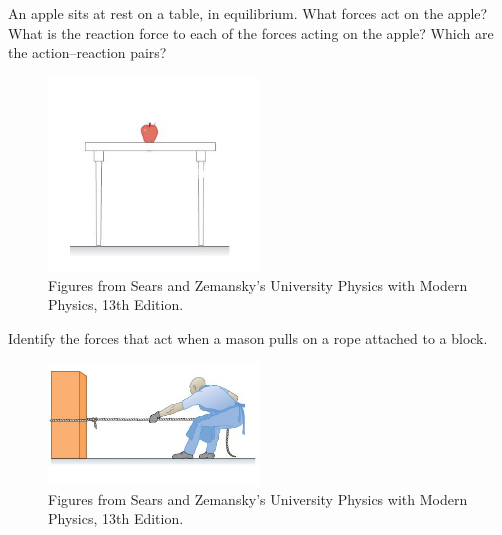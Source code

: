 \documentclass[]{beamer}
\begin{document}
    \begin{frame}
      An apple sits at rest on a table, in equilibrium. What forces act on
      the apple? What is the reaction force to each of the forces acting on
      the apple? Which are the action–reaction pairs?
      \vspace{5mm}
    

      \begin{figure}[h!]  
        \includegraphics[width=0.5\textwidth]{images/f12.jpg}
        \caption{ {\tiny Figures from Sears and Zemansky's University Physics 
        with Modern Physics, 13th Edition.} }
      \end{figure}

      \end{frame}











    

    \begin{frame}
      Identify the forces that act when a mason pulls on a rope attached to a block.
      \vspace{5mm}
    

      \begin{figure}[h!]  
        \includegraphics[width=0.5\textwidth]{images/f13.jpg}
        \caption{ {\tiny Figures from Sears and Zemansky's University Physics 
        with Modern Physics, 13th Edition.} }
      \end{figure}

      \end{frame}
\end{document}
